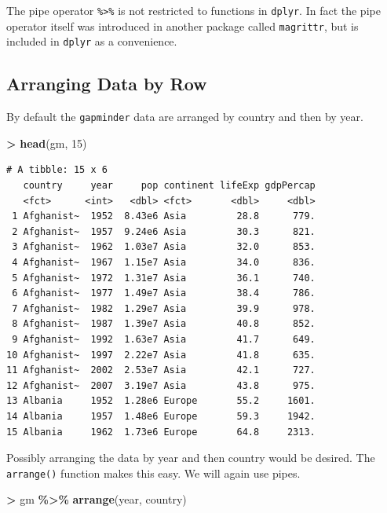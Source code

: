 \documentclass[
]{krantz}
\makeatletter
\newenvironment{Shaded}{\begin{snugshade}}{\end{snugshade}}
\newcommand{\DecValTok}[1]{\textcolor[rgb]{0.06,0.06,0.06}{#1}}
\newcommand{\KeywordTok}[1]{\textcolor[rgb]{0.27,0.27,0.27}{\textbf{#1}}}
\newcommand{\NormalTok}[1]{#1}
\newcommand{\OperatorTok}[1]{\textcolor[rgb]{0.43,0.43,0.43}{\textbf{#1}}}
\newcommand{\StringTok}[1]{\textcolor[rgb]{0.5,0.5,0.5}{#1}}
\newenvironment{kframe}{%
\medskip{}
\setlength{\fboxsep}{.8em}
 \def\at@end@of@kframe{}%
 \ifinner\ifhmode%
  \def\at@end@of@kframe{\end{minipage}}%
  \begin{minipage}{\columnwidth}%
 \fi\fi%
 \def\FrameCommand##1{\hskip\@totalleftmargin \hskip-\fboxsep
 \colorbox{shadecolor}{##1}\hskip-\fboxsep
     \hskip-\linewidth \hskip-\@totalleftmargin \hskip\columnwidth}%
 \MakeFramed {\advance\hsize-\width
   \@totalleftmargin\z@ \linewidth\hsize
   \@setminipage}}%
 {\par\unskip\endMakeFramed%
 \at@end@of@kframe}
\renewenvironment{Shaded}{\begin{kframe}}{\end{kframe}}
\makeatother
\begin{document}
The pipe operator \texttt{\%\textgreater{}\%} is not restricted to functions in \texttt{dplyr}. In fact the pipe operator itself was introduced in another package called \texttt{magrittr}, but is included in \texttt{dplyr} as a convenience.

\hypertarget{arranging-data-by-row}{%
\subsection{Arranging Data by Row}\label{arranging-data-by-row}}

By default the \texttt{gapminder} data are arranged by country and then by year.

\begin{Shaded}
\begin{Highlighting}[]
\OperatorTok{\textgreater{}}\StringTok{ }\KeywordTok{head}\NormalTok{(gm, }\DecValTok{15}\NormalTok{)}
\end{Highlighting}
\end{Shaded}

\begin{verbatim}
# A tibble: 15 x 6
   country     year     pop continent lifeExp gdpPercap
   <fct>      <int>   <dbl> <fct>       <dbl>     <dbl>
 1 Afghanist~  1952  8.43e6 Asia         28.8      779.
 2 Afghanist~  1957  9.24e6 Asia         30.3      821.
 3 Afghanist~  1962  1.03e7 Asia         32.0      853.
 4 Afghanist~  1967  1.15e7 Asia         34.0      836.
 5 Afghanist~  1972  1.31e7 Asia         36.1      740.
 6 Afghanist~  1977  1.49e7 Asia         38.4      786.
 7 Afghanist~  1982  1.29e7 Asia         39.9      978.
 8 Afghanist~  1987  1.39e7 Asia         40.8      852.
 9 Afghanist~  1992  1.63e7 Asia         41.7      649.
10 Afghanist~  1997  2.22e7 Asia         41.8      635.
11 Afghanist~  2002  2.53e7 Asia         42.1      727.
12 Afghanist~  2007  3.19e7 Asia         43.8      975.
13 Albania     1952  1.28e6 Europe       55.2     1601.
14 Albania     1957  1.48e6 Europe       59.3     1942.
15 Albania     1962  1.73e6 Europe       64.8     2313.
\end{verbatim}

Possibly arranging the data by year and then country would be desired. The \texttt{arrange()} function makes this easy. We will again use pipes.

\begin{Shaded}
\begin{Highlighting}[]
\OperatorTok{\textgreater{}}\StringTok{ }\NormalTok{gm }\OperatorTok{\%\textgreater{}\%}\StringTok{ }\KeywordTok{arrange}\NormalTok{(year, country)}
\end{Highlighting}
\end{Shaded}
\end{document}

